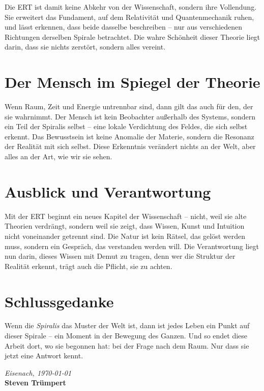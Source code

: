 Die ERT ist damit keine Abkehr von der Wissenschaft, sondern ihre Vollendung.  
Sie erweitert das Fundament, auf dem Relativität und Quantenmechanik ruhen,  
und lässt erkennen, dass beide dasselbe beschreiben –  
nur aus verschiedenen Richtungen derselben Spirale betrachtet.  
Die wahre Schönheit dieser Theorie liegt darin,  
dass sie nichts zerstört, sondern alles vereint.

\section*{Der Mensch im Spiegel der Theorie}
Wenn Raum, Zeit und Energie untrennbar sind,  
dann gilt das auch für den, der sie wahrnimmt.  
Der Mensch ist kein Beobachter außerhalb des Systems,  
sondern ein Teil der Spiralis selbst –  
eine lokale Verdichtung des Feldes, die sich selbst erkennt.  
Das Bewusstsein ist keine Anomalie der Materie,  
sondern die Resonanz der Realität mit sich selbst.  
Diese Erkenntnis verändert nichts an der Welt,  
aber alles an der Art, wie wir sie sehen.

\section*{Ausblick und Verantwortung}
Mit der ERT beginnt ein neues Kapitel der Wissenschaft –  
nicht, weil sie alte Theorien verdrängt,  
sondern weil sie zeigt, dass Wissen, Kunst und Intuition  
nicht voneinander getrennt sind.  
Die Natur ist kein Rätsel, das gelöst werden muss,  
sondern ein Gespräch, das verstanden werden will.  
Die Verantwortung liegt nun darin, dieses Wissen mit Demut zu tragen,  
denn wer die Struktur der Realität erkennt,  
trägt auch die Pflicht, sie zu achten.

\section*{Schlussgedanke}
Wenn die \emph{Spiralis} das Muster der Welt ist,  
dann ist jedes Leben ein Punkt auf dieser Spirale –  
ein Moment in der Bewegung des Ganzen.  
Und so endet diese Arbeit dort, wo sie begonnen hat:  
bei der Frage nach dem Raum.  
Nur dass sie jetzt eine Antwort kennt.

\vspace{20em}
\begin{flushright}
\textit{Eisenach, {\today}} 
\\[0.5em]
\textbf{Steven Trümpert}
\end{flushright}
